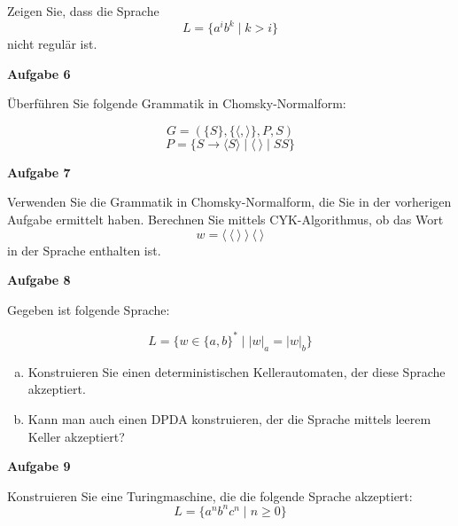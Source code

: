 \documentclass[a4paper,12pt]{article}
\newcommand{\Aufgabe}[1]{
	{
		\vspace*{0.5cm}
		\textsf{\textbf{Aufgabe #1}}
		\vspace*{0.2cm}
		
	}
}
\begin{document}
	Zeigen Sie, dass die Sprache
	$$L=\{a^ib^k \mid k > i\}$$
	nicht regulär ist.
	
	\Aufgabe{6}
	
	Überführen Sie folgende Grammatik in Chomsky-Normalform:
	
	$$G=(\{S\}, \{\langle,\rangle\},P,S)$$
	$$P=\{S \rightarrow \langle S\rangle \mid \langle\:\rangle \mid SS\}$$
	
	\Aufgabe{7}
	
	Verwenden Sie die Grammatik in Chomsky-Normalform, die Sie in der vorherigen Aufgabe ermittelt haben. Berechnen Sie mittels CYK-Algorithmus, ob das Wort
	$$w=\langle\:\langle\:\rangle\:\rangle\:\langle\:\rangle$$ in der Sprache enthalten ist.
	
	\Aufgabe{8}
	
	Gegeben ist folgende Sprache:
	
	$$L=\{w \in \{a,b\}^* \mid |w|_a=|w|_b\}$$
	
	\begin{enumerate}[a)]
		\item Konstruieren Sie einen deterministischen Kellerautomaten, der diese Sprache akzeptiert.
		\item Kann man auch einen DPDA konstruieren, der die Sprache mittels leerem Keller akzeptiert?
	\end{enumerate}
	
	\Aufgabe{9}
	
	Konstruieren Sie eine Turingmaschine, die die folgende Sprache akzeptiert:
	$$L=\{a^nb^nc^n \mid n \geq 0\}$$
\end{document}
